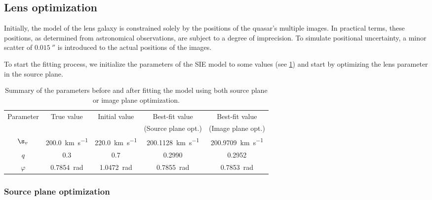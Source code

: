 \subsection{Lens optimization}
Initially, the model of the lens galaxy is constrained solely by the positions of the quasar's multiple images. In practical terms, these positions, as determined from astronomical observations, are subject to a degree of imprecision. To simulate positional uncertainty, a minor scatter of $\SI{0.015}{\arcsecond}$ is introduced to the actual positions of the images.

To start the fitting process, we initialize the parameters of the SIE model to some values (see \cref{tab:parameters_sl}) and start by optimizing the lens parameter in the source plane.

\begin{table}[t]
\setlength{\extrarowheight}{2pt}
\setlength{\tabcolsep}{1pt}
\centering
\caption{Summary of the parameters before and after fitting the model using both source plane or image plane optimization.}
\label{tab:parameters_sl}
\begin{tabular}{@{}c@{\hskip 10pt}c@{}@{\hskip 10pt}c@{}@{\hskip 10pt}c@{}@{\hskip 10pt}c@{}}
\toprule
Parameter         & True value                          & Initial value                         & Best-fit value                            & Best-fit value                            \\
                  &                                     &                                       & (Source plane opt.)                       & (Image plane opt.)                        \\ \midrule
$\s_v$            & \SI{200.0}{\kilo\meter\per\second}  & \SI{220.0}{\kilo\meter\per\second}    & \SI{200.1128}{\kilo\meter\per\second}     & \SI{200.9709}{\kilo\meter\per\second}     \\ 
$q$               & \SI{0.3}{}                          & \SI{0.7}{}                            & \SI{0.2990}{}                             & \SI{0.2952}{}                             \\
$\varphi$         & \SI{0.7854}{\radian}                & \SI{1.0472}{\radian}                  & \SI{0.7855}{\radian}                      & \SI{0.7853}{\radian}                      \\ \bottomrule
\end{tabular}
\end{table}


\subsubsection{Source plane optimization}
\label{subsubsec:sl_source_plane}

